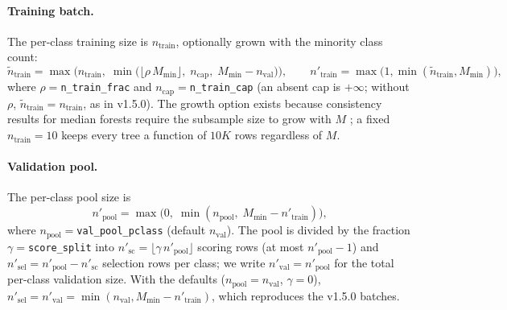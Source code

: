 \documentclass[11pt,a4paper]{article}
\newcommand{\code}[1]{\texttt{#1}}
\begin{document}
\paragraph{Training batch.} The per-class training size is $n_{\text{train}}$, optionally grown with the minority class count:
\begin{equation}
  \tilde{n}_{\text{train}} = \max\!\Big(n_{\text{train}},\; \min\!\big(\lfloor \rho\, M_{\min} \rfloor,\; n_{\text{cap}},\; M_{\min} - n_{\text{val}}\big)\Big),
  \qquad
  n'_{\text{train}} = \max\!\big(1, \min(\tilde{n}_{\text{train}}, M_{\min})\big),
\end{equation}
where $\rho = {}$\code{n\_train\_frac} and $n_{\text{cap}} = {}$\code{n\_train\_cap} (an absent cap is $+\infty$; without $\rho$, $\tilde{n}_{\text{train}} = n_{\text{train}}$, as in v1.5.0). The growth option exists because consistency results for median forests require the subsample size to grow with $M$ \citep{duroux2018}; a fixed $n_{\text{train}} = 10$ keeps every tree a function of $10K$ rows regardless of $M$.

\paragraph{Validation pool.} The per-class pool size is
\begin{equation}
  n'_{\text{pool}} = \max\!\big(0,\; \min(n_{\text{pool}},\; M_{\min} - n'_{\text{train}})\big),
\end{equation}
where $n_{\text{pool}} = {}$\code{val\_pool\_pclass} (default $n_{\text{val}}$). The pool is divided by the fraction $\gamma = {}$\code{score\_split} into $n'_{\text{sc}} = \lfloor \gamma\, n'_{\text{pool}} \rfloor$ scoring rows (at most $n'_{\text{pool}} - 1$) and $n'_{\text{sel}} = n'_{\text{pool}} - n'_{\text{sc}}$ selection rows per class; we write $n'_{\text{val}} = n'_{\text{pool}}$ for the total per-class validation size. With the defaults ($n_{\text{pool}} = n_{\text{val}}$, $\gamma = 0$), $n'_{\text{sel}} = n'_{\text{val}} = \min(n_{\text{val}}, M_{\min} - n'_{\text{train}})$, which reproduces the v1.5.0 batches.
\end{document}
